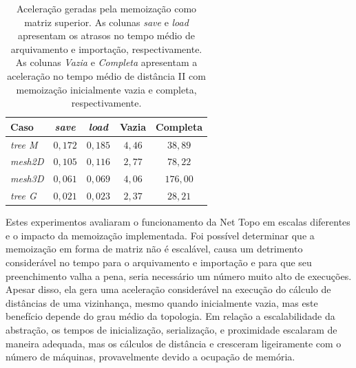 \setlength{\tabcolsep}{0.5em}
\begin{table}[!ht]
    \centering
    \begin{tabular}{l c c c c}
        \toprule
        \textbf{Caso}       & \textbf{\textit{save}} &    \textbf{\textit{load}} & \textbf{Vazia} & \textbf{Completa}\\ \midrule
        \textit{tree M}     & $0,172$   & $0,185$ & $4,46$ & $38,89 $ \\
        \textit{mesh2D}     & $0,105$   & $0,116$ & $2,77$ & $78,22$ \\
        \textit{mesh3D}     & $0,061$   & $0,069$ & $4,06$ & $176,00$  \\ 
        \textit{tree G}     & $0,021$   & $0,023$ & $2,37$ & $28,21$ \\ \bottomrule
    \end{tabular}
    \caption[Aceleração da memoização.]{Aceleração geradas pela memoização como matriz superior. As colunas \textit{save} e \textit{load} apresentam os atrasos no tempo médio de arquivamento e importação, respectivamente. As colunas \textit{Vazia} e \textit{Completa} apresentam a aceleração no tempo médio de distância II com memoização inicialmente vazia e completa, respectivamente. }
    \label{tab:memoi_worth}
\end{table}

Estes experimentos avaliaram o funcionamento da Net Topo em escalas diferentes e o impacto da memoização implementada.
Foi possível determinar que a memoização em forma de matriz não é escalável, causa um detrimento considerável no tempo para o arquivamento e importação e para que seu preenchimento valha a pena, seria necessário um número muito alto de execuções.
Apesar disso, ela gera uma aceleração considerável na execução do cálculo de distâncias de uma vizinhança, mesmo quando inicialmente vazia, mas este benefício depende do grau médio da topologia.
Em relação a escalabilidade da abstração, os tempos de inicialização, serialização, e proximidade escalaram de maneira adequada, mas os cálculos de distância e \hops cresceram ligeiramente com o número de máquinas, provavelmente devido a ocupação de memória.
